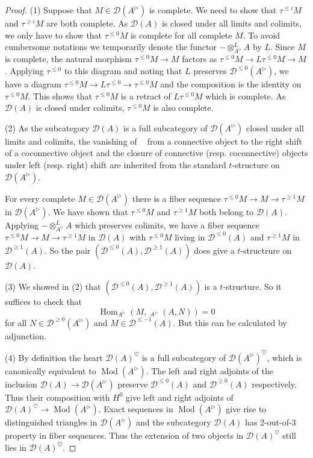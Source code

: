\documentclass{article}
\theoremstyle{plain}
\theoremstyle{definition}
\theoremstyle{remark}
\DeclareMathOperator{\Hom}{Hom}
\DeclareMathOperator{\Homs}{\underline{Hom}}
\DeclareMathOperator{\rhoms}{\underline{RHom}}
\DeclareMathOperator{\modcat}{Mod}
\newcommand{\dten}{\otimes ^{L}}
\newcommand{\huflag}{\triangleright}
\newcommand{\D}{\mathcal{D}}
\newcommand{\heart}{\heartsuit}
\newcommand{\resp}[1]{{\color{respcolor}(resp. #1)}}
\begin{document}
\begin{proof}
(1)
Suppose that $ M \in \D (A ^{\huflag}) $ is complete. We need to show that $ \tau ^{\leq i} M $ and $ \tau ^{\geq i}M $ are both complete.
As $ \D (A) $ is closed under all limits and colimits, we only have to show that $ \tau ^{\leq 0}M $ is complete for all complete $ M $.
To avoid cumbersome notations we temporarily denote the functor $ -\dten _{A ^{\huflag}} A $ by $ L $.
Since $ M $ is complete, the natural morphism $ \tau ^{\leq 0}M\to M $ factors as $ \tau ^{\leq 0}M\to L \tau ^{\leq 0}M\to M $.
Applying $ \tau ^{\leq 0} $ to this diagram and noting that $ L $ preserves $ \D ^{\leq 0} (A ^{\huflag}) $,
we have a diagram $ \tau ^{\leq 0}M\to L \tau ^{\leq 0}\to \tau ^{\leq 0}M $ and the composition is the identity on $ \tau ^{\leq 0} M $.
This shows that $ \tau ^{\leq 0}M $ is a retract of $ L \tau ^{\leq 0}M $ which is complete.
As $ \D (A) $ is closed under colimits, $ \tau ^{\leq 0}M $ is also complete.

(2)
As the subcategory $ \D (A) $ is a full subcategory of $ \D (A ^{\huflag}) $ closed under all limits and colimits,
the vanishing of $ \rhoms $ from a connective object to the right shift of a coconnective object
and the closure of connective \resp{coconnective} objects under left \resp{right} shift
are inherited from the standard $ t $-structure on $ \D (A ^{\huflag}) $.

For every complete $ M\in \D (A ^{\huflag}) $ there is a fiber sequence
$ \tau ^{\leq 0}M\to M\to \tau ^{\geq 1}M $ in $ \D (A ^{\huflag}) $.
We have shown that $ \tau ^{\leq 0}M $ and $ \tau ^{\geq 1}M $ both belong to $ \D (A) $.
Applying $ -\dten _{A ^{\huflag}} A $ which preserves colimits, we have a fiber sequence
$ \tau ^{\leq 0}M\to M\to \tau ^{\geq 1}M $ in $ \D (A) $
with $ \tau ^{\leq 0}M $ living in $ \D ^{\leq 0}(A) $ and $ \tau ^{\geq 1}M $ in $ \D ^{\geq 1}(A) $.
So the pair $ (\D ^{\leq 0}(A), \D ^{\geq 1}(A)) $ does give a $ t $-structrure on $ \D (A) $.

(3)
We showed in (2) that $ (\D ^{\leq 0}(A), \D ^{\geq 1}(A)) $ is a $ t $-structure.
So it suffices to check that $$ \Hom _{A ^{\huflag}}(M, \Homs _{A ^{\huflag}}(A, N)) = 0 $$
for all $ N\in \D ^{\geq 0}(A ^{\huflag}) $ and $ M\in \D ^{\leq -1}(A) $.
But this can be calculated by adjunction.

(4)
By definition the heart $ \D (A)^{\heart} $ is a full subcategory of $ \D (A ^{\huflag})^{\heart} $, which is canonically equivalent to 
$ \modcat (A ^{\huflag}) $.
The left and right adjoints of the inclusion $ \D (A)\to \D (A ^{\huflag}) $
preserve $ \D ^{\leq 0}(A) $ and $ \D ^{\geq 0}(A) $ respectively.
Thus their composition with $ H ^{0} $ give left and right adjoints of $ \D (A)^{\heart}\to \modcat (A ^{\huflag}) $.
Exact sequences in $ \modcat (A ^{\huflag}) $ give rise to distinguished triangles in $ \D (A ^{\huflag}) $ and
the subcategory $ \D (A) $ has 2-out-of-3 property in fiber sequences. Thus the extension of two objects in $ \D (A) ^{\heart} $
still lies in $ \D (A) ^{\heart} $.


\end{proof}
\end{document}
